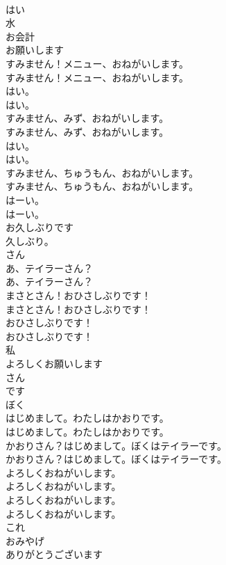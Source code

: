 \documentclass[8pt]{extreport}
\begin{document}
\begin{CJK}{UTF8}{min}
\\	はい
\\	水
\\	お会計
\\	お願いします
\\	すみません！メニュー、おねがいします。	
\\	すみません！メニュー、おねがいします。 
\\	はい。	
\\	はい。 
\\	すみません、みず、おねがいします。	
\\	すみません、みず、おねがいします。 
\\	はい。	
\\	はい。 
\\	すみません、ちゅうもん、おねがいします。	
\\	すみません、ちゅうもん、おねがいします。 
\\	はーい。	
\\	はーい。 
\\	お久しぶりです
\\	久しぶり。
\\	さん
\\	あ、テイラーさん？	
\\	あ、テイラーさん？ 
\\	まさとさん！おひさしぶりです！	
\\	まさとさん！おひさしぶりです！ 
\\	おひさしぶりです！	
\\	おひさしぶりです！ 
\\	私
\\	よろしくお願いします
\\	さん
\\	です
\\	ぼく
\\	はじめまして。わたしはかおりです。	
\\	はじめまして。わたしはかおりです。 
\\	かおりさん？はじめまして。ぼくはテイラーです。	
\\	かおりさん？はじめまして。ぼくはテイラーです。 
\\	よろしくおねがいします。	
\\	よろしくおねがいします。 
\\	よろしくおねがいします。	
\\	よろしくおねがいします。 
\\	これ
\\	おみやげ
\\	ありがとうございます

\end{CJK}
\end{document}

